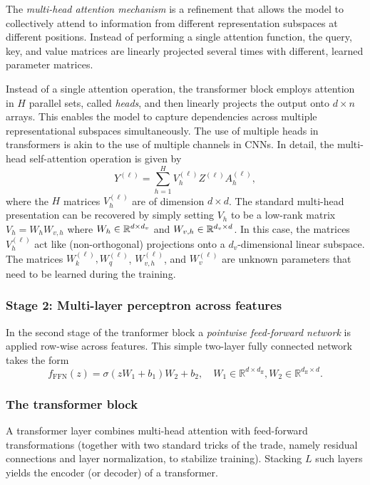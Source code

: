 The {\em multi-head attention mechanism} is a refinement that allows the model to collectively attend to information from different representation subspaces at different positions. Instead of performing a single attention function, the query, key, and value matrices are linearly projected several times with different, learned parameter matrices.







Instead of a single attention operation, the transformer block employs attention in $H$ parallel 
sets, called {\em heads}, and then
linearly projects the output onto $d \times n$ arrays. This enables the model to capture dependencies across multiple representational subspaces simultaneously. The use of multiple heads in transformers is akin to the use of multiple channels in CNNs.
In detail, the multi-head self-attention operation is given by
\begin{equation}\label{multihead}
Y^{(\ell)} = \sum_{h=1}^H V_h^{(\ell)} Z^{(\ell)}A_h^{(\ell)} ,
\end{equation}
where the $H$  matrices $V_h^{(\ell)}$ are of dimension $d \times d$.
The standard multi-head presentation can be recovered
by simply setting $V_h$ to be a low-rank matrix
$V_h = W_h W_{v,h}$ where $W_h \in \mathbb{R}^{d \times d_v}$ and $W_{v,h} \in \mathbb{R}^{d_v \times d}$.
In this case, the matrices $V_h^{(\ell)}$ act like (non-orthogonal) projections onto a $d_v$-dimensional linear subspace.
The matrices $W_k^{(\ell)}, W_q^{(\ell)}$, $W_{v,h}^{(\ell)}$, and $W_v^{(\ell)}$ are  unknown parameters that need to be learned during the training.



\subsubsection{Stage 2: Multi-layer perceptron across features}

In the second stage of the tranformer block a {\em pointwise feed-forward network} is applied row-wise across features. This simple two-layer fully connected network  takes the form
   $$
   f_{\text{FFN}}(z) = \sigma(zW_1 + b_1) W_2 + b_2, \quad W_1 \in \mathbb{R}^{d \times d_{\text{ff}}},  W_2 \in \mathbb{R}^{d_{\text{ff}} \times d}.
   $$


\subsubsection{The transformer block}
A transformer layer combines multi-head attention with feed-forward transformations (together with two standard tricks of the trade, namely residual connections and layer normalization, to stabilize training). Stacking $L$ such layers yields the encoder (or decoder)  of a transformer. 

